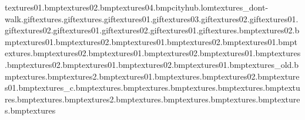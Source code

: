 textures\glassblue01.bmp textures\glassblue02.bmp textures\citypave04.bmp cityhub.lom textures\walk_dont-walk.gif textures\samtv.gif textures\marvinwash.gif textures\chubsamshop01.gif textures\chubgladlights03.gif textures\chubgladlights02.gif textures\chubgladlights01.gif textures\chubgladcheck02.gif textures\chubgladcheck01.gif textures\chubflash02.gif textures\chubflash01.gif textures\wires.bmp textures\winyell02.bmp textures\winyell01.bmp textures\winthornt02.bmp textures\winthornt01.bmp textures\winstar02.bmp textures\winstar01.bmp textures\winsports.bmp textures\winreflect02.bmp textures\winreflect01.bmp textures\winhandle02.bmp textures\winhandle01.bmp textures\wings.bmp textures\winexplan02.bmp textures\winexplan01.bmp textures\wineon02.bmp textures\wineon01.bmp textures\window_old.bmp textures\windowouter.bmp textures\window2.bmp textures\window01.bmp textures\window.bmp textures\winblind02.bmp textures\winblind01.bmp textures\wheel_c.bmp textures\warningline.bmp textures\vanwindow.bmp textures\vantire.bmp textures\vanside.bmp textures\vanroof.bmp textures\vanpanel.bmp textures\vanlight2.bmp textures\vanguardrear.bmp textures\vanguard.bmp textures\vanbonet.bmp textures\vanbackdoor.bmp textures\van 